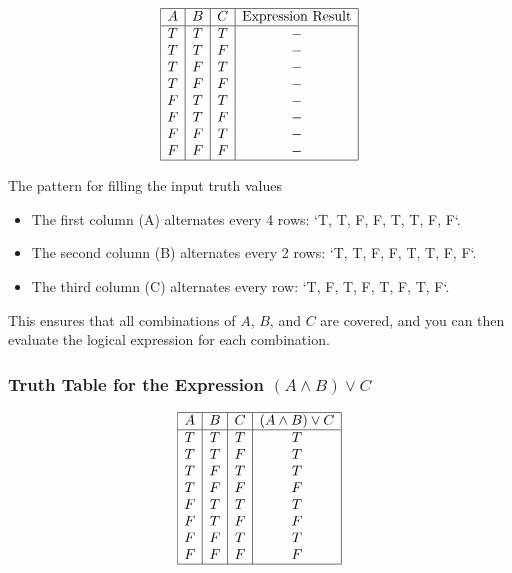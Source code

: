 \[
	\begin{array}{|c|c|c|c|}
		\hline
		A & B & C & \text{Expression Result} \\
		\hline
		T & T & T &       -                  \\
		T & T & F &       -                  \\
		T & F & T &       -                  \\
		T & F & F &       -                  \\
		F & T & T &       -                  \\
		F & T & F &       -                  \\
		F & F & T &       -                  \\
		F & F & F &       -                  \\
		\hline
	\end{array}
\]

The pattern for filling the input truth values

\begin{itemize}

	\item The first column (A) alternates every 4 rows: `T, T, F, F, T, T, F, F`.

	\item The second column (B) alternates every 2 rows: `T, T, F, F, T, T, F, F`.

	\item The third column (C) alternates every row: `T, F, T, F, T, F, T, F`.

\end{itemize}

This ensures that all combinations of \(A\), \(B\), and \(C\) are covered, and you 
can then evaluate the logical expression for each combination.

\subsubsection{Truth Table for the Expression \texorpdfstring{\( (A \land B) \lor C \)}{}}

\[
	\begin{array}{|c|c|c|c|}
		\hline
		A & B & C & (A \land B) \lor C \\
		\hline
		T & T & T & T                  \\
		T & T & F & T                  \\
		T & F & T & T                  \\
		T & F & F & F                  \\
		F & T & T & T                  \\
		F & T & F & F                  \\
		F & F & T & T                  \\
		F & F & F & F                  \\
		\hline
	\end{array}
\]

